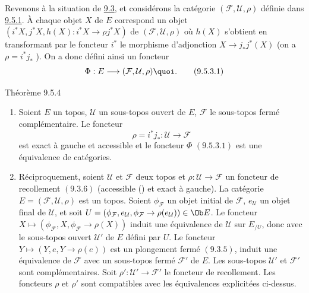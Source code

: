 \documentclass[10pt]{../fichiers-configuration-latex/smfart}
\begin{document}
\subsubsection{}
Revenons à la situation de \hyperref[IV.subsec9.3]{9.3}, et considérons la
catégorie $(\mathcal{F},\mathcal{U}, \rho)$ définie dans
\hyperref[IV.subsubsec9.5.1]{9.5.1}. À chaque objet $X$ de $E$ correspond un
objet $(i^{\ast}X, j^{\ast}X, h(X):i^{\ast}X\rightarrow \rho
j^{\ast}X)$ de $(\mathcal{F}, \mathcal{U},\rho)$ où $h(X)$ s'obtient
en transformant par le foncteur $i^{\ast}$ le morphisme d'adjonction
$X\rightarrow j_{\ast}j^{\ast}(X)$ (on a $\rho=i^{\ast}j_{\ast}$
). On a donc défini ainsi un foncteur
\begin{equation*}
\Phi:E\longrightarrow (\mathcal{F}, \mathcal{U},
\rho){\quoi}.\tag{9.5.3.1}
\end{equation*}

\begin{enonce*}{Théorème 9.5.4}
\begin{enumerate}
\renewcommand{\theenumi}{\alph{enumi}}
\renewcommand{\labelenumi}{\theenumi)}
\item Soient $E$ un topos, $\mathcal{U}$ un sous-topos ouvert de $E$,
$\mathcal{F}$ le sous-topos fermé complémentaire. Le foncteur
$$
\rho=i^{\ast}j_{\ast}:\mathcal{U} \longrightarrow \mathcal{F}
$$
est exact à gauche et accessible et le foncteur $\Phi$ $(9.5.3.1)$
est une équivalence de catégories.

\item Réciproquement, soient $\mathcal{U}$ et $\mathcal{F}$ deux topos et
$\rho:\mathcal{U}\rightarrow \mathcal{F}$ un foncteur de recollement
$(\hyperref[IV.subsubsec9.3.6]{9.3.6})$ (\ie accessible {\rm ()}
et exact à gauche). La catégorie $E=(\mathcal{F},\mathcal{U},\rho)$
est un topos. Soient $\phi_{\mathcal{F}}$ un objet initial de
$\mathcal{F}$, $e_{\mathcal{U}}$ un objet final de $\mathcal{U}$, et
soit $U=(\phi_{\mathcal{F}},e_{\mathcal{U}},
\phi_{\mathcal{F}}\rightarrow \rho(e_{\mathcal{U}}))\in \Ob E$. Le
foncteur $X\mapsto (\phi_{\mathcal{F}},
X,\phi_{\mathcal{F}}\rightarrow \rho(X))$ induit une équivalence de
$\mathcal{U}$ sur $E_{/U}$, donc avec le sous-topos ouvert
$\mathcal{U}'$ de $E$ défini par $U$. Le foncteur $Y\mapsto
(Y,e,Y\rightarrow \rho(e))$ est un plongement fermé
$(\hyperref[IV.subsubsec9.3.5]{9.3.5})$, \ie induit une équivalence de
$\mathcal{F}$ avec un sous-topos fermé $\mathcal{F}'$ de $E$. Les
sous-topos $\mathcal{U}'$ et $\mathcal{F}'$\pageoriginale sont
complémentaires. Soit $\rho':\mathcal{U}'\rightarrow \mathcal{F}'$
le foncteur de recollement. Les foncteurs $\rho$ et $\rho'$ sont
compatibles avec les équivalences explicitées ci-dessus.
\end{enumerate}
\end{enonce*}
\end{document}
